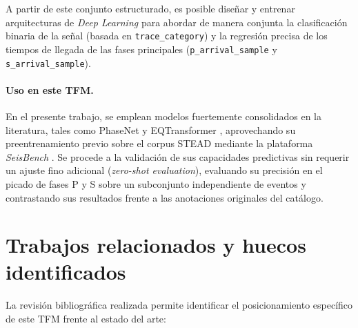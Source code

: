 A partir de este conjunto estructurado, es posible diseñar y entrenar arquitecturas de \textit{Deep Learning} para abordar de manera conjunta la clasificación binaria de la señal (basada en \texttt{trace\_category}) y la regresión precisa de los tiempos de llegada de las fases principales (\texttt{p\_arrival\_sample} y \texttt{s\_arrival\_sample}).

\paragraph{Uso en este TFM.}
En el presente trabajo, se emplean modelos fuertemente consolidados en la literatura, tales como PhaseNet \citep{zhu2018phasenet} y EQTransformer \citep{mousavi2020eqtransformer}, aprovechando su preentrenamiento previo sobre el corpus STEAD mediante la plataforma \emph{SeisBench} \citep{woollam2022seisbench}. Se procede a la validación de sus capacidades predictivas sin requerir un ajuste fino adicional (\textit{zero-shot evaluation}), evaluando su precisión en el picado de fases P y S sobre un subconjunto independiente de eventos y contrastando sus resultados frente a las anotaciones originales del catálogo.

\section{Trabajos relacionados y huecos identificados}
\label{trabajos-relacionados}

La revisión bibliográfica realizada permite identificar el posicionamiento específico de este TFM frente al estado del arte:

